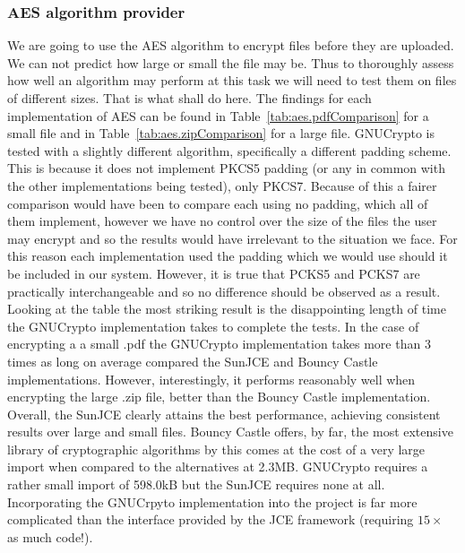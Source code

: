 \documentclass[12pt, titlepage]{article}
\begin{document}
\subsubsection{AES algorithm provider}
We are going to use the AES algorithm to encrypt files before they are uploaded. We can not predict how large or small the file may be. Thus to thoroughly assess how well an algorithm may perform at this task we will need to test them on files of different sizes. That is what shall do here.
\newline \indent The findings for each implementation of AES can be found in Table~\ref{tab:aes.pdfComparison} for a small file and in Table~\ref{tab:aes.zipComparison} for a large file.
\newline \indent GNUCrypto is tested with a slightly different algorithm, specifically a different padding scheme. This is because it does not implement PKCS5 padding (or any in common with the other implementations being tested), only PKCS7. Because of this a fairer comparison would have been to compare each using no padding, which all of them implement, however we have no control over the size of the files the user may encrypt and so the results would have irrelevant to the situation we face. For this reason each implementation used the padding which we would use should it be included in our system. However, it is true that PCKS5 and PCKS7 are practically interchangeable and so no difference should be observed as a result.
\newline Looking at the table the most striking result is the disappointing length of time the GNUCrypto implementation takes to complete the tests. In the case of encrypting a a small .pdf the GNUCrypto implementation takes more than 3 times as long on average compared the SunJCE and Bouncy Castle implementations. However, interestingly, it performs reasonably well when encrypting the large .zip file, better than the Bouncy Castle implementation. Overall, the SunJCE clearly attains the best performance, achieving consistent results over large and small files.
\newline \indent Bouncy Castle offers, by far, the most extensive library of cryptographic algorithms by this comes at the cost of a very large import when compared to the alternatives at 2.3MB. GNUCrypto requires a rather small import of 598.0kB but the SunJCE requires none at all.
\newline \indent Incorporating the GNUCrpyto implementation into the project is far more complicated than the interface provided by the JCE framework (requiring $15\times$ as much code!).
\end{document}
